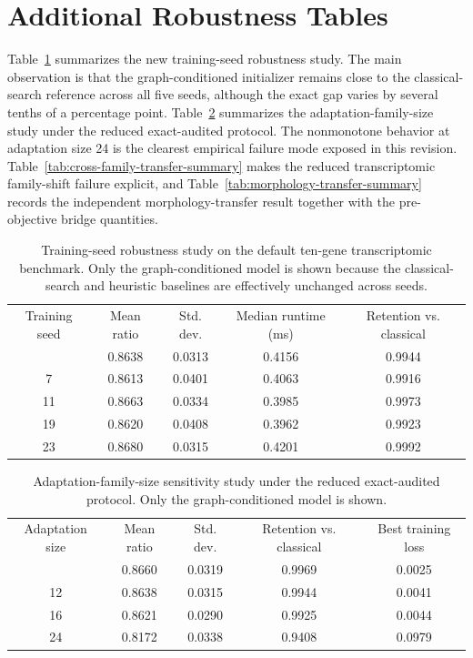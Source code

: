 \documentclass[
  reprint,
  twocolumn,
  aps,
  superscriptaddress,
  longbibliography,
  floatfix
]{revtex4-2}
\begin{document}
\section{Additional Robustness Tables}

Table~\ref{tab:seed-sweep-summary} summarizes the new training-seed robustness study. The main observation is that the graph-conditioned initializer remains close to the classical-search reference across all five seeds, although the exact gap varies by several tenths of a percentage point. Table~\ref{tab:adaptation-sweep-summary} summarizes the adaptation-family-size study under the reduced exact-audited protocol. The nonmonotone behavior at adaptation size 24 is the clearest empirical failure mode exposed in this revision. Table~\ref{tab:cross-family-transfer-summary} makes the reduced transcriptomic family-shift failure explicit, and Table~\ref{tab:morphology-transfer-summary} records the independent morphology-transfer result together with the pre-objective bridge quantities.

\begin{table}[t]
\caption{Training-seed robustness study on the default ten-gene transcriptomic benchmark. Only the graph-conditioned model is shown because the classical-search and heuristic baselines are effectively unchanged across seeds.}
\label{tab:seed-sweep-summary}
\begin{ruledtabular}
\begin{tabular}{ccccc}
Training seed & Mean ratio & Std. dev. & Median runtime (ms) & Retention vs. classical \\
\colrule
3 & 0.8638 & 0.0313 & 0.4156 & 0.9944 \\
7 & 0.8613 & 0.0401 & 0.4063 & 0.9916 \\
11 & 0.8663 & 0.0334 & 0.3985 & 0.9973 \\
19 & 0.8620 & 0.0408 & 0.3962 & 0.9923 \\
23 & 0.8680 & 0.0315 & 0.4201 & 0.9992 \\
\end{tabular}
\end{ruledtabular}
\end{table}

\begin{table}[t]
\caption{Adaptation-family-size sensitivity study under the reduced exact-audited protocol. Only the graph-conditioned model is shown.}
\label{tab:adaptation-sweep-summary}
\begin{ruledtabular}
\begin{tabular}{ccccc}
Adaptation size & Mean ratio & Std. dev. & Retention vs. classical & Best training loss \\
\colrule
8 & 0.8660 & 0.0319 & 0.9969 & 0.0025 \\
12 & 0.8638 & 0.0315 & 0.9944 & 0.0041 \\
16 & 0.8621 & 0.0290 & 0.9925 & 0.0044 \\
24 & 0.8172 & 0.0338 & 0.9408 & 0.0979 \\
\end{tabular}
\end{ruledtabular}
\end{table}
\end{document}
